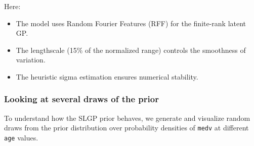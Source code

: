 \documentclass[
]{article}
\providecommand{\tightlist}{%
  \setlength{\itemsep}{0pt}\setlength{\parskip}{0pt}}
\begin{document}
Here:

\begin{itemize}
\tightlist
\item
  The model uses Random Fourier Features (RFF) for the finite-rank latent GP.
\item
  The lengthscale (15\% of the normalized range) controls the smoothness of variation.
\item
  The heuristic sigma estimation ensures numerical stability.
\end{itemize}

\subsubsection{Looking at several draws of the prior}\label{looking-at-several-draws-of-the-prior}

To understand how the SLGP prior behaves, we generate and visualize random draws from the prior distribution over probability densities of \texttt{medv} at different \texttt{age} values.
\end{document}
